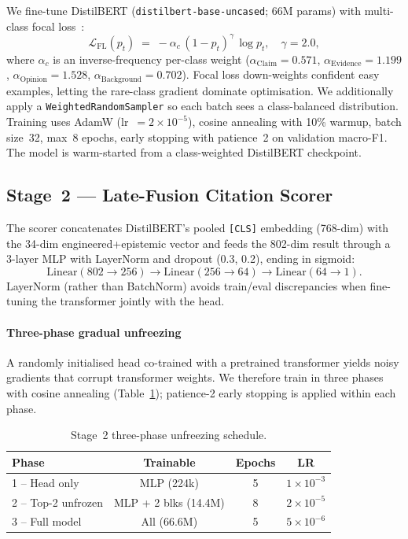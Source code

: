 \documentclass[conference]{IEEEtran}
\begin{document}
We fine-tune DistilBERT (\texttt{distilbert-base-uncased}; 66M params) with
multi-class focal loss~\cite{lin2017focal}:
\[
\mathcal{L}_{\text{FL}}(p_t) \;=\; -\alpha_c\,(1-p_t)^{\gamma}\,\log p_t,
\quad \gamma=2.0,
\]
where $\alpha_c$ is an inverse-frequency per-class weight
($\alpha_{\text{Claim}}{=}0.571$, $\alpha_{\text{Evidence}}{=}1.199$,
$\alpha_{\text{Opinion}}{=}1.528$, $\alpha_{\text{Background}}{=}0.702$).
Focal loss down-weights confident easy examples, letting the rare-class
gradient dominate optimisation. We additionally apply a
\texttt{WeightedRandomSampler} so each batch sees a class-balanced
distribution. Training uses AdamW (lr~$=2{\times}10^{-5}$), cosine
annealing with 10\% warmup, batch size~32, max~8 epochs, early
stopping with patience~2 on validation macro-F1. The model is warm-started
from a class-weighted DistilBERT checkpoint.

\subsection{Stage~2 — Late-Fusion Citation Scorer}
\label{sec:stage2}

The scorer concatenates DistilBERT's pooled \texttt{[CLS]} embedding
(768-dim) with the 34-dim engineered+epistemic vector and feeds the
802-dim result through a 3-layer MLP with LayerNorm and dropout
(0.3, 0.2), ending in sigmoid:
\[
\mathrm{Linear}(802{\to}256) \to
\mathrm{Linear}(256{\to}64)  \to
\mathrm{Linear}(64{\to}1).
\]
LayerNorm (rather than BatchNorm) avoids train/eval discrepancies when
fine-tuning the transformer jointly with the head.

\paragraph{Three-phase gradual unfreezing}
A randomly initialised head co-trained with a pretrained transformer
yields noisy gradients that corrupt transformer weights. We therefore
train in three phases with cosine annealing
(Table~\ref{tab:phases}); patience-2 early stopping is applied
within each phase.

\begin{table}[t]
\centering
\caption{Stage~2 three-phase unfreezing schedule.}
\label{tab:phases}
\small
\setlength{\tabcolsep}{4pt}
\begin{tabular}{lccc}
\toprule
\textbf{Phase} & \textbf{Trainable} & \textbf{Epochs} & \textbf{LR} \\
\midrule
1 -- Head only      & MLP (224k)              & 5 & $1{\times}10^{-3}$ \\
2 -- Top-2 unfrozen & MLP + 2 blks (14.4M)    & 8 & $2{\times}10^{-5}$ \\
3 -- Full model     & All (66.6M)             & 5 & $5{\times}10^{-6}$ \\
\bottomrule
\end{tabular}
\end{table}
\end{document}

